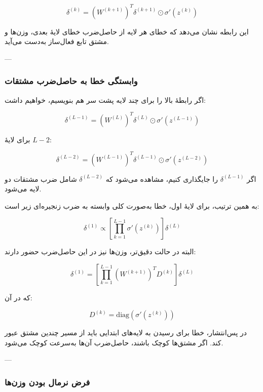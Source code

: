 \documentclass[12pt,a4paper]{article}
\begin{document}
\begin{tcolorbox}[
	colback=lightblue,
	colframe=mainblue,
	title=رابطهٔ اصلی پس‌انتشار خطا
	]
	\[
	\boxed{
		\delta^{(k)}
		=
		\left(W^{(k+1)}\right)^T
		\delta^{(k+1)}
		\odot
		\sigma'(z^{(k)})
	}
	\]
	
	این رابطه نشان می‌دهد که خطای هر لایه از حاصل‌ضرب خطای لایهٔ بعدی، وزن‌ها و مشتق تابع فعال‌ساز به‌دست می‌آید.
\end{tcolorbox}

---

\subsubsection{وابستگی خطا به حاصل‌ضرب مشتقات}

اگر رابطهٔ بالا را برای چند لایه پشت سر هم بنویسیم، خواهیم داشت:

\[
\delta^{(L-1)}
=
\left(W^{(L)}\right)^T
\delta^{(L)}
\odot
\sigma'(z^{(L-1)})
\]

برای لایهٔ \(L-2\):

\[
\delta^{(L-2)}
=
\left(W^{(L-1)}\right)^T
\delta^{(L-1)}
\odot
\sigma'(z^{(L-2)})
\]

اگر \(\delta^{(L-1)}\) را جایگذاری کنیم، مشاهده می‌شود که \(\delta^{(L-2)}\) شامل ضرب مشتقات دو لایه می‌شود.

به همین ترتیب، برای لایهٔ اول، خطا به‌صورت کلی وابسته به ضرب زنجیره‌ای زیر است:

\[
\delta^{(1)}
\propto
\left[
\prod_{k=1}^{L-1}
\sigma'(z^{(k)})
\right]
\delta^{(L)}
\]

البته در حالت دقیق‌تر، وزن‌ها نیز در این حاصل‌ضرب حضور دارند:

\[
\delta^{(1)}
=
\left[
\prod_{k=1}^{L-1}
\left(W^{(k+1)}\right)^T
D^{(k)}
\right]
\delta^{(L)}
\]

که در آن:

\[
D^{(k)}=\mathrm{diag}\left(\sigma'(z^{(k)})\right)
\]

\begin{tcolorbox}[
	colback=softpink,
	colframe=softred,
	title=نکتهٔ بسیار مهم
	]
	در پس‌انتشار، خطا برای رسیدن به لایه‌های ابتدایی باید از مسیر چندین مشتق عبور کند. اگر مشتق‌ها کوچک باشند، حاصل‌ضرب آن‌ها به‌سرعت کوچک می‌شود.
\end{tcolorbox}

---

\subsubsection{فرض نرمال بودن وزن‌ها}
\end{document}
